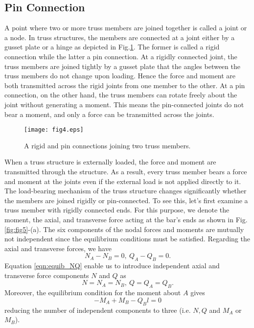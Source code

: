 ﻿\documentclass[10pt,a4j]{article}
\begin{document}
\subsection{Pin Connection}
A point where two or more truss members are joined together is called a joint or a node. In truss structures, the members are connected at a joint either by a gusset plate or a hinge as depicted in Fig.\ref{fig:fig4}. The former is called a rigid connection while the latter a pin connection. At a rigidly connected joint, the truss members are joined tightly by a gusset plate that the angles between the truss members do not change upon loading. Hence the force and moment are both transmitted across the rigid joints from one member to the other. At a pin connection, on the other hand, the truss members can rotate freely about the joint without generating a moment. This means the pin-connected joints do not bear a moment, and only a force can be transmitted across the joints. 
\begin{figure}[h]
	\begin{center}
	\texttt{[image: fig4.eps]} 
	\end{center}
	\caption{A rigid and pin connections joining two truss members.} 
	\label{fig:fig4}
\end{figure}

When a truss structure is externally loaded, the force and moment are transmitted through the structure. As a result, every truss member bears a force and moment at the joints even if the external load is not applied directly to it. The load-bearing mechanism of the truss structure changes significantly whether the members are joined rigidly or pin-connected. To see this, let's first examine a truss member with rigidly connected ends. For this purpose, we denote the moment, the axial, and transverse force acting at the bar's ends as shown in Fig.\ref{fig:fig5}-(a). The six components of the nodal forces and moments are mutually not independent since the equilibrium conditions must be satisfied.
Regarding the axial and transverse forces, we have 
\begin{equation}
	N_A-N_B=0, \ Q_A-Q_B=0.
	\label{eqn:equib_NQ}
\end{equation}
Equation \ref{eqn:equib_NQ} enable us to introduce independent axial and transverse force components 
$N$ and $Q$ as
\begin{equation}
	N=N_A=N_B,\  Q=Q_A=Q_B.
	\label{eqn:def_NQ}
\end{equation}
Moreover, the equilibrium condition for the moment about $A$ gives 
\begin{equation}
	-M_A+M_B-Q_Bl=0 
	\label{eqn:equib_Mab}
\end{equation}
reducing the number of independent components to three (i.e. $N,Q$ and $M_A$ or $M_B$).\\
\end{document}
